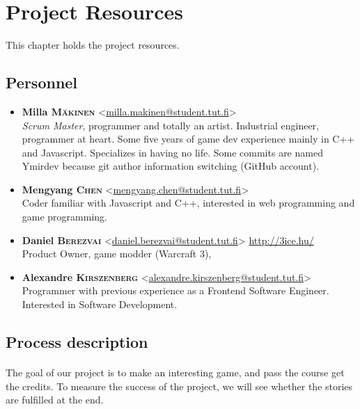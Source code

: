 \section{Project Resources}

This chapter holds the project resources.

\subsection{Personnel}

\begin{itemize}
  \item \textbf{Milla \textsc{Mäkinen}} <\href{mailto:milla.makinen@student.tut.fi}{milla.makinen@student.tut.fi}> \\
        \emph{Scrum Master}, programmer and totally an artist. Industrial engineer, programmer at heart. Some five years of game dev experience mainly in C++ and Javascript. Specializes in having no life. Some commits are named Ymirdev because git author information switching (GitHub account).
  \item \textbf{Mengyang \textsc{Chen}} <\href{mailto:mengyang.chen@student.tut.fi}{mengyang.chen@student.tut.fi}> \\
        Coder familiar with Javascript and C++, interested in web programming and game programming.
  \item \textbf{Daniel \textsc{Berezvai}} <\href{mailto:daniel.berezvai@student.tut.fi}{daniel.berezvai@student.tut.fi}> \href{http://3ice.hu/}{http://3ice.hu/} \\
        Product Owner, game modder (Warcraft 3),
  \item \textbf{Alexandre \textsc{Kirszenberg}} <\href{mailto:alexandre.kirszenberg@student.tut.fi}{alexandre.kirszenberg@student.tut.fi}>
        Programmer with previous experience as a Frontend Software Engineer. Interested in Software Development.
\end{itemize}

\subsection{Process description}

\paragraph{} The goal of our project is to make an interesting game, and pass the  course get the credits. To measure the success of the project, we will see whether the stories are fulfilled at the end.

